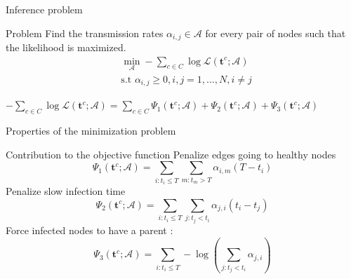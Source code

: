 \documentclass{beamer}
\begin{document}
\begin{frame}{Inference problem}
    \begin{block}{Problem}
    Find the transmission rates $\alpha_{i,j} \in \mathscr{A}$ for every pair of nodes such that the likelihood is maximized.
    \begin{equation}
    \begin{split}
        &\min_{\mathscr{A}} -\sum_{c\in C}\log \mathscr{L}(\textbf{t}^c;\mathscr{A})\\
        &\text{s.t  } \alpha_{i,j}\geq 0, i,j = 1,\dots,N, i\neq j
    \end{split}
    \end{equation}
    \end{block}
            $-\sum_{c\in C}\log \mathscr{L}(\textbf{t}^c;\mathscr{A}) =\sum_{c \in C}\Psi_1(\textbf{t}^c;\mathscr{A})+\Psi_2(\textbf{t}^c;\mathscr{A})+\Psi_3(\textbf{t}^c;\mathscr{A})$
\end{frame}
\begin{frame}{Properties of the minimization problem}
\begin{block}{Contribution to the objective function}
Penalize edges going to healthy nodes \begin{equation*}
    \Psi_1(\textbf{t}^c;\mathscr{A}) = \sum_{i:t_i\leq T}\sum_{m : t_m>T} \alpha_{i,m}(T-t_i)
\end{equation*}
Penalize slow infection time \begin{equation*}
    \Psi_2(\textbf{t}^c;\mathscr{A}) = \sum_{i:t_i\leq T}\sum_{j : t_j<t_i} \alpha_{j,i}(t_i-t_j)
\end{equation*}
Force infected nodes to have a parent :
\begin{equation*}
    \Psi_3(\textbf{t}^c;\mathscr{A}) = \sum_{i:t_i\leq T}-\log(\sum_{j:t_j<t_i}\alpha_{j,i})
\end{equation*}
\end{block}
\end{frame}
\end{document}
